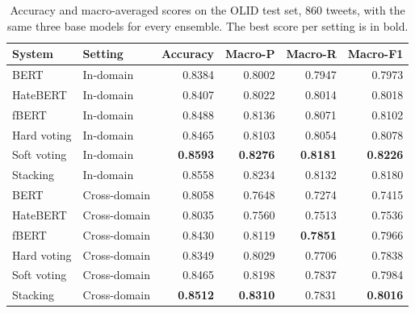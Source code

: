 \documentclass[11pt,a4paper]{article}
\begin{document}
\begin{table}[H]
\centering
\caption{Accuracy and macro-averaged scores on the OLID test set, 860 tweets, with the same three base models for every ensemble. The best score per setting is in bold.}
\label{tab:main}
\begin{tabular}{llrrrr}
\toprule
System & Setting & Accuracy & Macro-P & Macro-R & Macro-F1 \\
\midrule
BERT        & In-domain & 0.8384 & 0.8002 & 0.7947 & 0.7973 \\
HateBERT    & In-domain & 0.8407 & 0.8022 & 0.8014 & 0.8018 \\
fBERT       & In-domain & 0.8488 & 0.8136 & 0.8071 & 0.8102 \\
Hard voting & In-domain & 0.8465 & 0.8103 & 0.8054 & 0.8078 \\
Soft voting & In-domain & \textbf{0.8593} & \textbf{0.8276} & \textbf{0.8181} & \textbf{0.8226} \\
Stacking    & In-domain & 0.8558 & 0.8234 & 0.8132 & 0.8180 \\
\midrule
BERT        & Cross-domain & 0.8058 & 0.7648 & 0.7274 & 0.7415 \\
HateBERT    & Cross-domain & 0.8035 & 0.7560 & 0.7513 & 0.7536 \\
fBERT       & Cross-domain & 0.8430 & 0.8119 & \textbf{0.7851} & 0.7966 \\
Hard voting & Cross-domain & 0.8349 & 0.8029 & 0.7706 & 0.7838 \\
Soft voting & Cross-domain & 0.8465 & 0.8198 & 0.7837 & 0.7984 \\
Stacking    & Cross-domain & \textbf{0.8512} & \textbf{0.8310} & 0.7831 & \textbf{0.8016} \\
\bottomrule
\end{tabular}
\end{table}
\end{document}
